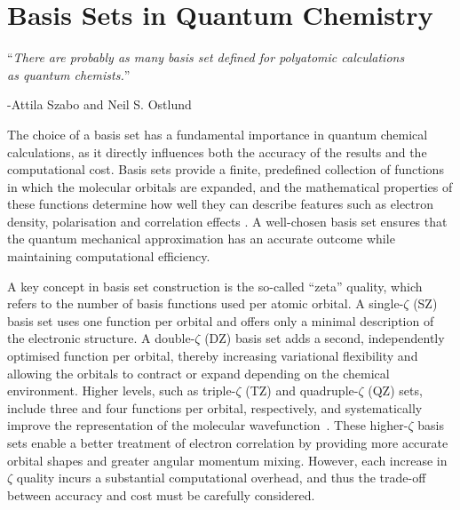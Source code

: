 \section{Basis Sets in Quantum Chemistry}\label{basis_set_sec}

\begin{flushright}
  {\small
  ``{\em There are probably as many basis set defined for polyatomic
         calculations \\  as quantum chemists.}''
  
  -Attila Szabo and Neil S. Ostlund
  }
\end{flushright}

\noindent The choice of a basis set has a fundamental importance in quantum
chemical calculations, as it directly influences both the accuracy of the
results and the computational cost. Basis sets provide a finite, predefined
collection of functions in which the molecular orbitals are expanded, and the
mathematical properties of these functions determine how well they can describe
features such as electron density, polarisation and correlation effects
\cite{szabo, jensen2013introduction}. A well-chosen basis set ensures that the
quantum mechanical approximation has an accurate outcome while maintaining
computational efficiency.

A key concept in basis set construction is the so-called ``zeta'' quality,
which refers to the number of basis functions used per atomic orbital. A
single-$\zeta$ (SZ) basis set uses one function per orbital and offers only a
minimal description of the electronic structure. A double-$\zeta$ (DZ) basis set
adds a second, independently optimised function per orbital, thereby increasing
variational flexibility and allowing the orbitals to contract or expand
depending on the chemical environment. Higher levels, such as triple-$\zeta$ (TZ)
and quadruple-$\zeta$ (QZ) sets, include three and four functions per orbital,
respectively, and systematically improve the representation of the molecular
wavefunction~\cite{Dunning1989, Weigend2005}. These higher-$\zeta$ basis sets
enable a better treatment of electron correlation by providing more accurate
orbital shapes and greater angular momentum mixing.  However, each increase in
$\zeta$ quality incurs a substantial computational overhead, and thus the
trade-off between accuracy and cost must be carefully considered.

